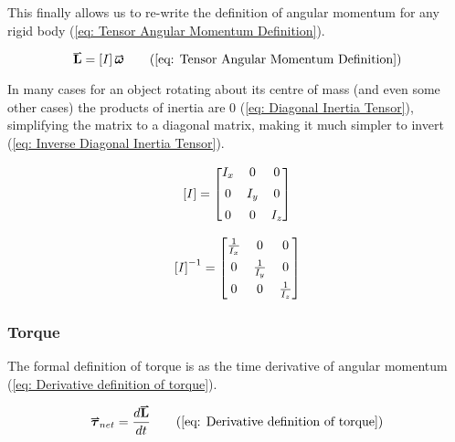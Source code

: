\documentclass[main.tex]{subfiles}
\begin{document}
                    This finally allows us to re-write the definition of angular momentum for any rigid body (\eqref{eq: Tensor Angular Momentum Definition}).

                    \begin{equation*}
                        \vect{L} = \mtrx{I}\vect{\omega}
                        \tag{\eqnum{eq: Tensor Angular Momentum Definition}}
                    \end{equation*}


                    In many cases for an object rotating about its centre of mass (and even some other cases) the products of inertia are 0 (\eqref{eq: Diagonal Inertia Tensor}), simplifying the matrix to a diagonal matrix, making it much simpler to invert (\eqref{eq: Inverse Diagonal Inertia Tensor}).

                    \begin{equation}
                        \left[I\right] = \begin{bmatrix} I_x & 0 & 0\\[0.5em]
                                            0 & I_y & 0\\[0.5em]
                                            0 & 0 & I_z \end{bmatrix}
                        \label{eq: Diagonal Inertia Tensor}
                    \end{equation}

                    \begin{equation}
                        \left[I\right]^{-1} = \begin{bmatrix} \frac{1}{I_x} & 0 & 0\\[0.5em]
                                            0 & \frac{1}{I_y} & 0\\[0.5em]
                                            0 & 0 & \frac{1}{I_z} \end{bmatrix}
                        \label{eq: Inverse Diagonal Inertia Tensor}
                    \end{equation}



                \newpage
                
                \subsubsection{Torque}

                    The formal definition of torque is as the time derivative of angular momentum (\eqref{eq: Derivative definition of torque}). 

                    \begin{equation*}
                        \vect{\tau}_{net} = \frac{d\vect{L}}{dt}
                        \tag{\eqnum{eq: Derivative definition of torque}}
                    \end{equation*}
\end{document}
